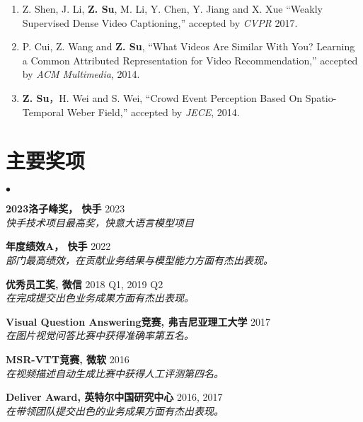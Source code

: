\documentclass[margin,line]{res}
\newenvironment{list2}{
  \begin{list}{$\bullet$}{%
      \setlength{\itemsep}{0in}
      \setlength{\parsep}{0in} \setlength{\parskip}{0in}
      \setlength{\topsep}{0in} \setlength{\partopsep}{0in}
      \setlength{\leftmargin}{0.2in}}}{\end{list}}
\begin{document}
\begin{resume}
\begin{enumerate}[leftmargin=*]
		\item Z. Shen, J. Li, \textbf{Z. Su},  M. Li, Y. Chen, Y. Jiang and X. Xue ``Weakly Supervised Dense Video Captioning,'' accepted by \emph{CVPR} 2017.

		\item P. Cui, Z. Wang and \textbf{Z. Su}, ``What Videos Are Similar With You? Learning a Common Attributed Representation for Video Recommendation,'' accepted by \emph{ACM Multimedia}, 2014.

		\item \textbf{Z. Su}，H. Wei and S. Wei, ``Crowd Event Perception Based On Spatio-Temporal Weber Field,'' accepted by \emph{JECE}, 2014.

	\end{enumerate}

	\section{\sc 主要奖项}
	\begin{list2}
		\item \textbf{2023洛子峰奖， 快手} \hfill{2023}
		\\\emph{快手技术项目最高奖，快意大语言模型项目}
		\item \textbf{年度绩效A， 快手} \hfill{2022}
		\\\emph{部门最高绩效，在贡献业务结果与模型能力方面有杰出表现。}
		\item \textbf{优秀员工奖, 微信} \hfill{2018 Q1, 2019 Q2}
		\\\emph{在完成提交出色业务成果方面有杰出表现。}
		\item \textbf{Visual Question Answering竞赛, 弗吉尼亚理工大学} \hfill{2017}
		\\\emph{在图片视觉问答比赛中获得准确率第五名。}
		\item \textbf{MSR-VTT竞赛, 微软} \hfill{2016}
		\\\emph{在视频描述自动生成比赛中获得人工评测第四名。}
		\item \textbf{Deliver Award, 英特尔中国研究中心} \hfill{2016, 2017}
		\\\emph{在带领团队提交出色的业务成果方面有杰出表现。}

	\end{list2}

\end{resume}
\end{document}
